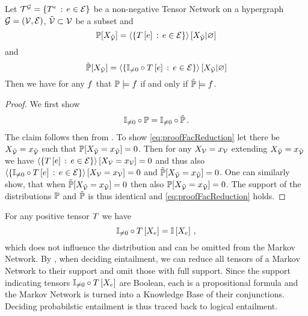 \begin{theorem}\label{the:factorReduction}
	Let $\mathcal{T}^{\mathcal{G}}=\{T^{e}\, : \, e\in\mathcal{E}\}$ be a non-negative Tensor Network on a hypergraph $\mathcal{G}=(\mathcal{V},\mathcal{E})$, $\tilde{\mathcal{V}}\subset\mathcal{V}$ be a subset and
		\[ \mathbb{P}[X_{\tilde{\mathcal{V}}}] = \left\langle \{T\left[e\right] \, : \, e\in\mathcal{E} \}\right\rangle \left[ X_{\tilde{\mathcal{V}}} | \varnothing \right] \]
	and
		\[ \tilde{\mathbb{P}}[X_{\tilde{\mathcal{V}}}] = \left\langle \{\mathbb{I}_{\neq0} \circ T\left[e\right] \, : \, e\in\mathcal{E} \}\right\rangle \left[ X_{\tilde{\mathcal{V}}} | \varnothing \right] \]
	Then we have for any $f$ that $\mathbb{P}\models f$ if and only if $\tilde{\mathbb{P}}\models f$.
\end{theorem}
\begin{proof}
	We first show
	\begin{align}\label{eq:proofFacReduction}
		 \mathbb{I}_{\neq0}\circ\mathbb{P} = \mathbb{I}_{\neq0}\circ\tilde{\mathbb{P}} \, . 
	\end{align}
	The claim follows then from .
	To show \eqref{eq:proofFacReduction} let there be $X_{\tilde{\mathcal{V}}}=x_{\tilde{\mathcal{V}}}$ such that $\mathbb{P}[X_{\tilde{\mathcal{V}}}=x_{\tilde{\mathcal{V}}}]=0$.
	Then for any $X_{\mathcal{V}}=x_{\mathcal{V}}$ extending  $X_{\tilde{\mathcal{V}}}=x_{\tilde{\mathcal{V}}}$ we have $\left\langle \{T\left[e\right] \, : \, e\in\mathcal{E} \}\right\rangle \left[ X_{\mathcal{V}}=x_{\mathcal{V}} \right] = 0$ and thus also $\left\langle \{\mathbb{I}_{\neq0}\circ T\left[e\right] \, : \, e\in\mathcal{E} \}\right\rangle \left[ X_{\mathcal{V}}=x_{\mathcal{V}} \right] = 0$ and $\tilde{\mathbb{P}}[X_{\tilde{\mathcal{V}}}=x_{\tilde{\mathcal{V}}}]=0$.
	One can similarly show, that when $\tilde{\mathbb{P}}[X_{\tilde{\mathcal{V}}}=x_{\tilde{\mathcal{V}}}]=0$ then also ${\mathbb{P}}[X_{\tilde{\mathcal{V}}}=x_{\tilde{\mathcal{V}}}]=0$. 
	The support of the distributions $\mathbb{P}$ and $\tilde{\mathbb{P}}$ is thus identical and \eqref{eq:proofFacReduction} holds.
\end{proof}

For any positive tensor $T$ we have
	\[ \mathbb{I}_{\neq0}\circ T\left[X_{e}\right] = \mathbb{I}\left[X_{e}\right] \, , \]
which does not influence the distribution and can be omitted from the Markov Network.
By , when deciding eintailment, we can reduce all tensors of a Markov Network to their support and omit those with full support.
Since the support indicating tensors $\mathbb{I}_{\neq0}\circ T\left[X_{e}\right]$ are Boolean, each is a propositional formula and the Markov Network is turned into a Knowledge Base of their conjunctions.
Deciding probabilstic entailment is thus traced back to logical entailment.

